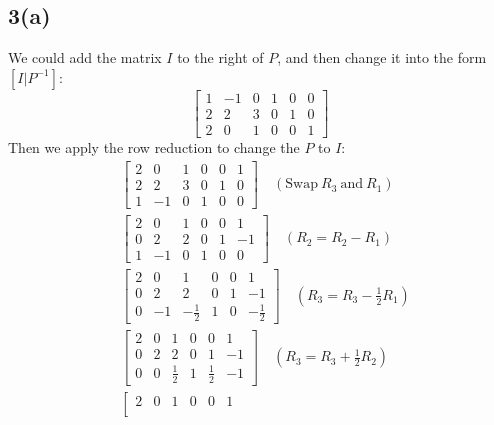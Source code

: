\documentclass{article}
\begin{document}
\subsection*{3(a)}
We could add the matrix $I$ to the right of $P$, and then change it into the form$[I|P^{-1}]$:
$$
\left[ 
    \begin{array}{ccc|ccc}
    1 & -1 & 0 & 1 & 0 & 0 \\
    2 & 2 & 3 & 0 & 1 & 0 \\
    2 & 0 & 1 & 0 & 0 & 1
    \end{array} 
\right]
$$
Then we apply the row reduction to change the $P$ to $I$:\\
$$
\begin{aligned}
    &\left[
    \begin{array}{ccc|ccc}
        2 & 0 & 1 & 0 & 0 & 1 \\
        2 & 2 & 3 & 0 & 1 & 0 \\
        1 & -1 & 0 & 1 & 0 & 0 
    \end{array}
    \right]
    \quad
    (\text{Swap} \ R_3 \ \text{and} \ R_1)
    \\
    &\left[
        \begin{array}{ccc|ccc}
            2 & 0 & 1 & 0 & 0 & 1 \\
            0 & 2 & 2 & 0 & 1 & -1 \\
            1 & -1 & 0 & 1 & 0 & 0 
        \end{array}
    \right]
    \quad
    (R_2 = R_2 - R_1)
    \\
    &\left[
        \begin{array}{ccc|ccc}
            2 & 0 & 1 & 0 & 0 & 1 \\
            0 & 2 & 2 & 0 & 1 & -1 \\
            0 & -1 & -\frac{1}{2} & 1 & 0 & -\frac{1}{2} 
        \end{array}
    \right]
    \quad
    (R_3 = R_3 - \frac{1}{2}R_1)
    \\
    &\left[
        \begin{array}{ccc|ccc}
            2 & 0 & 1 & 0 & 0 & 1 \\
            0 & 2 & 2 & 0 & 1 & -1 \\
            0 & 0 & \frac{1}{2} & 1 & \frac{1}{2} & -1 
        \end{array}
    \right]
    \quad
    (R_3 = R_3 + \frac{1}{2}R_2)
    \\
    &\left[
        \begin{array}{ccc|ccc}
            2 & 0 & 1 & 0 & 0 & 1 \\

\end{array}
\end{aligned}$$
\end{document}
